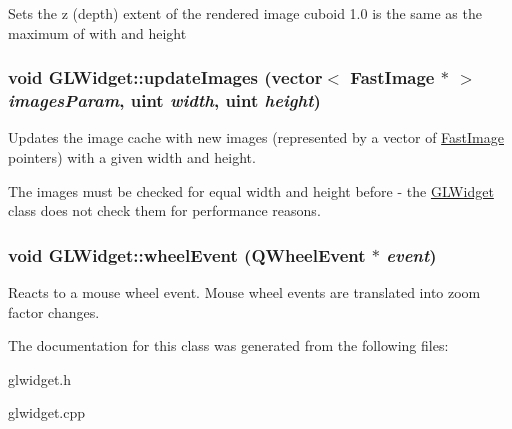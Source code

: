 \label{class_g_l_widget_a68406450ab1961b48ebc786cb61b4d48}
Sets the z (depth) extent of the rendered image cuboid 1.0 is the same as the maximum of with and height \hypertarget{class_g_l_widget_a9601076e0757c5fe221e28d3e9983b75}{
\subsubsection[{updateImages}]{\setlength{\rightskip}{0pt plus 5cm}void GLWidget::updateImages (vector$<$ {\bf FastImage} $\ast$ $>$ {\em imagesParam}, \/  uint {\em width}, \/  uint {\em height})}}
\label{class_g_l_widget_a9601076e0757c5fe221e28d3e9983b75}
Updates the image cache with new images (represented by a vector of \hyperlink{class_fast_image}{FastImage} pointers) with a given width and height.

The images must be checked for equal width and height before -\/ the \hyperlink{class_g_l_widget}{GLWidget} class does not check them for performance reasons. \hypertarget{class_g_l_widget_ab11fb26fd97e5bf66989f072760b1617}{
\subsubsection[{wheelEvent}]{\setlength{\rightskip}{0pt plus 5cm}void GLWidget::wheelEvent (QWheelEvent $\ast$ {\em event})}}
\label{class_g_l_widget_ab11fb26fd97e5bf66989f072760b1617}
Reacts to a mouse wheel event. Mouse wheel events are translated into zoom factor changes. 

The documentation for this class was generated from the following files:\begin{DoxyCompactItemize}
\item 
glwidget.h\item 
glwidget.cpp\end{DoxyCompactItemize}
